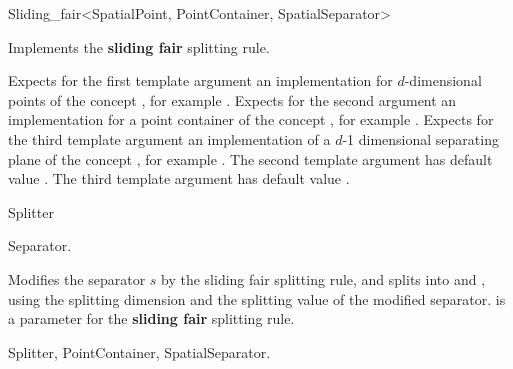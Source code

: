 

\begin{ccRefFunctionObjectClass}{Sliding_fair<SpatialPoint, PointContainer, SpatialSeparator>}  %


\ccDefinition
Implements the {\bf sliding fair} splitting rule.


\ccParameters

Expects for the first template argument an implementation for
$d$-dimensional points of
the concept , 
for example . Expects for the second argument an implementation
for a point container of the concept , for example .
Expects for the third template argument an implementation of a $d$-1 dimensional 
separating plane of the concept , for example .
The second template argument has default value .
The third template argument has default value . 


\ccIsModel

Splitter

\ccTypes

 {Separator.}


\ccOperations

{Modifies the separator $s$ by the sliding fair splitting rule, 
and splits  into  and ,
using the splitting dimension and the splitting value of the modified separator.
 is a parameter for the {\bf sliding fair} splitting rule.
}

\ccSeeAlso

Splitter, PointContainer, SpatialSeparator.

\end{ccRefFunctionObjectClass}



